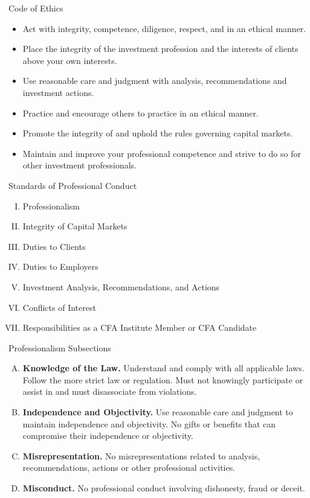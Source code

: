 \documentclass[../custom]{flashcards}
\begin{document}

\begin{flashcard}{Code of Ethics}
    \begin{itemize}
        \item Act with integrity, competence, diligence, respect, and in an ethical manner.
        \item Place the integrity of the investment profession and the interests of clients above your own interests.
        \item Use reasonable care and judgment with analysis, recommendations and investment actions.
        \item Practice and encourage others to practice in an ethical manner.
        \item Promote the integrity of and uphold the rules governing capital markets.
        \item Maintain and improve your professional competence and strive to do so for other investment professionals.
    \end{itemize}
\end{flashcard}

\begin{flashcard}{Standards of Professional Conduct}
    \begin{enumerate}[I.]
        \item Professionalism
        \item Integrity of Capital Markets
        \item Duties to Clients
        \item Duties to Employers
        \item Investment Analysis, Recommendations, and Actions
        \item Conflicts of Interest
        \item Responsibilities as a CFA Institute Member or CFA Candidate
    \end{enumerate}
\end{flashcard}

\begin{flashcard}{Professionalism Subsections}
    \begin{enumerate}[A.]
        \item \textbf{Knowledge of the Law.} Understand and comply with all applicable laws. Follow the more strict law or regulation. Must not knowingly participate or assist in and must disassociate from violations.
        \item \textbf{Independence and Objectivity.} Use reasonable care and judgment to maintain independence and objectivity. No gifts or benefits that can compromise their independence or objectivity.
        \item \textbf{Misrepresentation.} No misrepresentations related to analysis, recommendations, actions or other professional activities.
        \item \textbf{Misconduct.} No professional conduct involving dishonesty, fraud or deceit.
    \end{enumerate}
\end{flashcard}
\end{document}
